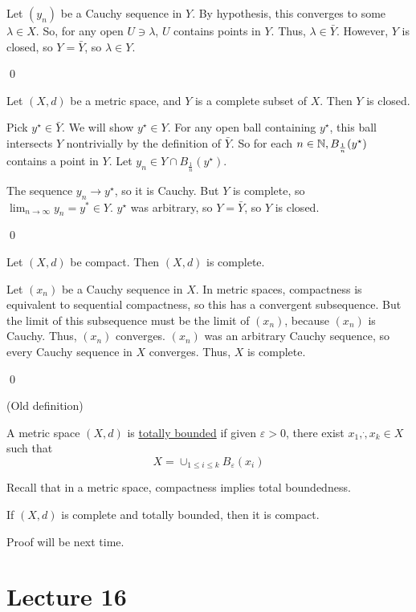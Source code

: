 \documentclass[x11names,reqno,14pt]{extarticle}
\newcommand*{\oo}{{\infty}}
\begin{document}
\proof

Let $(y_n)$ be a Cauchy sequence in $Y$. By hypothesis, this converges to some $\lambda \in X$. So, for any open $U \ni \lambda$, $U$ contains points in $Y$. Thus, $\lambda \in \bar{Y}$. However, $Y$ is closed, so $Y = \bar{Y}$, so $\lambda \in Y$. 

\qed

\thm

Let $(X, d)$ be a metric space, and $Y$ is a complete subset of $X$. Then $Y$ is closed. 

\proof

Pick $y^\star \in \bar{Y}$. We will show $y^\star \in Y$. For any open ball containing $y^\star$, this ball intersects $Y$ nontrivially by the definition of $\bar{Y}$. So for each $n \in \mathbb{N}, B_{\frac{1}{n}}(y^\star)$ contains a point in $Y$. Let $y_n \in Y \cap B_{\frac{1}{n}}(y^\star)$. 

The sequence $y_n \to y^\star$, so it is Cauchy. But $Y$ is complete, so $\lim_{n\to\oo}y_n = y^* \in Y$. $y^\star$ was arbitrary, so $Y = \bar{Y}$, so $Y$ is closed. 

\qed

\thm

Let $(X, d)$ be compact. Then $(X, d)$ is complete. 

\proof

Let $(x_n)$ be a Cauchy sequence in $X$. In metric spaces, compactness is equivalent to sequential compactness, so this has a convergent subsequence. But the limit of this subsequence must be the limit of $(x_n)$, because $(x_n)$ is Cauchy. Thus, $(x_n)$ converges. $(x_n)$ was an arbitrary Cauchy sequence, so every Cauchy sequence in $X$ converges. Thus, $X$ is complete. 

\qed

 (Old definition)

A metric space $(X, d)$ is \underline{totally bounded} if given $\varepsilon>0$, there exist $x_1, \dot, x_k \in X$ such that 
\[
X = \cup_{1\leq i\leq k}B_\varepsilon(x_i)
\]

Recall that in a metric space, compactness implies total boundedness. 

\thm

If $(X, d)$ is complete and totally bounded, then it is compact. 

Proof will be next time.

\section*{Lecture 16}
\end{document}
